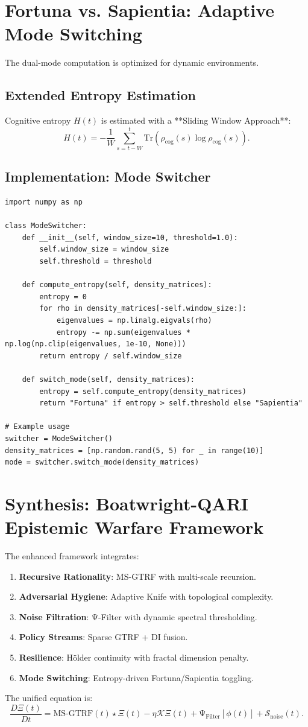 \documentclass[12pt]{article}
\begin{document}
\section{Fortuna vs. Sapientia: Adaptive Mode Switching}
The dual-mode computation is optimized for dynamic environments.

\subsection{Extended Entropy Estimation}
Cognitive entropy $H(t)$ is estimated with a **Sliding Window Approach**:
\[
H(t) = -\frac{1}{W} \sum_{s=t-W}^t \text{Tr}(\rho_{\text{cog}}(s) \log \rho_{\text{cog}}(s)).
\]

\subsection{Implementation: Mode Switcher}
\begin{verbatim}
import numpy as np

class ModeSwitcher:
    def __init__(self, window_size=10, threshold=1.0):
        self.window_size = window_size
        self.threshold = threshold
    
    def compute_entropy(self, density_matrices):
        entropy = 0
        for rho in density_matrices[-self.window_size:]:
            eigenvalues = np.linalg.eigvals(rho)
            entropy -= np.sum(eigenvalues * np.log(np.clip(eigenvalues, 1e-10, None)))
        return entropy / self.window_size
    
    def switch_mode(self, density_matrices):
        entropy = self.compute_entropy(density_matrices)
        return "Fortuna" if entropy > self.threshold else "Sapientia"

# Example usage
switcher = ModeSwitcher()
density_matrices = [np.random.rand(5, 5) for _ in range(10)]
mode = switcher.switch_mode(density_matrices)
\end{verbatim}

\section{Synthesis: Boatwright-QARI Epistemic Warfare Framework}
The enhanced framework integrates:
\begin{enumerate}
    \item \textbf{Recursive Rationality}: MS-GTRF with multi-scale recursion.
    \item \textbf{Adversarial Hygiene}: Adaptive Knife with topological complexity.
    \item \textbf{Noise Filtration}: Ψ-Filter with dynamic spectral thresholding.
    \item \textbf{Policy Streams}: Sparse GTRF + DI fusion.
    \item \textbf{Resilience}: Hölder continuity with fractal dimension penalty.
    \item \textbf{Mode Switching}: Entropy-driven Fortuna/Sapientia toggling.
\end{enumerate}
The unified equation is:
\[
\frac{D\Xi(t)}{Dt} = \text{MS-GTRF}(t) \star \Xi(t) - \eta \mathcal{K} \Xi(t) + \text{Ψ}_{\text{Filter}}[\phi(t)] + \mathcal{S}_{\text{noise}}(t).
\]
\end{document}
